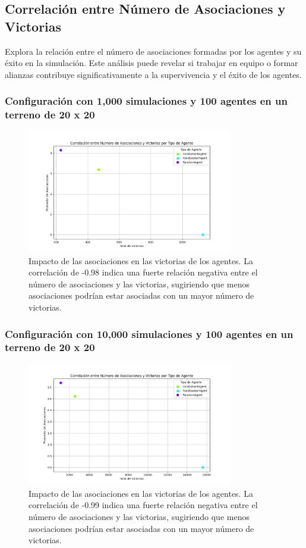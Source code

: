 \documentclass[11pt]{article}
\begin{document}
\subsection{Correlación entre Número de Asociaciones y Victorias}
Explora la relación entre el número de asociaciones formadas por los agentes y su éxito en la simulación. Este análisis puede revelar si trabajar en equipo o formar alianzas contribuye significativamente a la supervivencia y el éxito de los agentes.

\subsubsection{Configuración con 1,000 simulaciones y 100 agentes en un terreno de 20 x 20}
\begin{figure}[H]
    \centering
    \includegraphics[width=0.8\textwidth]{images/Figure_2.png}
    \caption{Impacto de las asociaciones en las victorias de los agentes. La correlación de -0.98 indica una fuerte relación negativa entre el número de asociaciones y las victorias, sugiriendo que menos asociaciones podrían estar asociadas con un mayor número de victorias.}
\end{figure}

\subsubsection{Configuración con 10,000 simulaciones y 100 agentes en un terreno de 20 x 20}
\begin{figure}[H]
    \centering
    \includegraphics[width=0.8\textwidth]{images/associations_correlation_num_simulations10000_size20x20_agents_count100.png}
    \caption{Impacto de las asociaciones en las victorias de los agentes. La correlación de -0.99 indica una fuerte relación negativa entre el número de asociaciones y las victorias, sugiriendo que menos asociaciones podrían estar asociadas con un mayor número de victorias.}
\end{figure}
\end{document}
